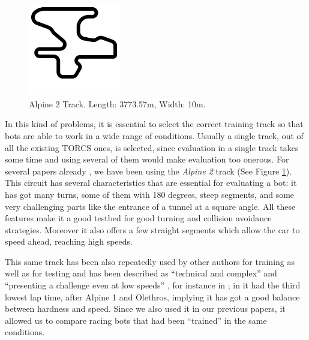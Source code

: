 \documentclass[10pt,journal,compsoc]{IEEEtran}
\begin{document}
%
\begin{figure}[!ht]	
	\begin{center}
		\includegraphics[width=4cm]{fig/alpine2.jpg}
		\caption{Alpine 2 Track. Length: 3773.57m, Width: 10m.}
		\label{fig:alpine2_track}	
	\end{center}	
      \end{figure}
%      
In this kind of problems, it is essential to select the correct
training track so that bots are able to work in a wide range of
conditions. Usually a single track, out of all the existing TORCS
ones, is selected, since evaluation in a single track takes some time
and using several of them would make evaluation too onerous. For
several papers already \cite{salem_cig2018,DBLP:conf/cig/SalemMG19},
we have been using the \textit{Alpine 2} track (See Figure
\ref{fig:alpine2_track}). This circuit has several characteristics that
are essential for evaluating a bot: it has got many turns, some of
them with 180 degrees, steep segments, and some very challenging parts
like the entrance of a tunnel at a square angle. All these features make
it a good testbed for good turning and collision avoidance
strategies. Moreover it also offers a few straight segments which allow the car to speed ahead, reaching high speeds. 

This same track has been also repeatedly used by other authors for training as well as for testing and has been described as ``technical and complex'' \cite{AG} and ``presenting a challenge even at low speeds'' \cite{vrajitoru2018global}, for instance in
\cite{cardamone2010applying,CarRacing_Pelta09,zong2017obstacle}; in \cite{AG} it had the third lowest lap time, after Alpine 1 and Olethros, implying it
has got a good balance between hardness and speed. Since we also used
it in our previous papers, it allowed us to compare racing bots that
had been ``trained'' in the same conditions.
\end{document}
